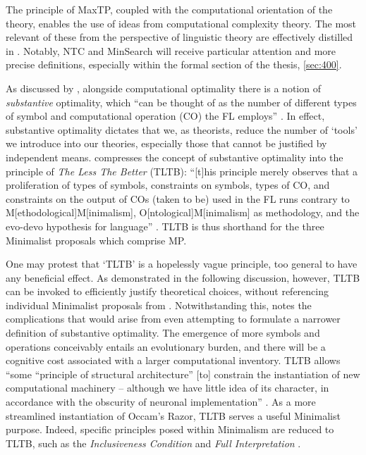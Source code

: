 The principle of MaxTP, coupled with the computational orientation of the theory, enables the use of ideas from computational complexity theory. The most relevant of these from the perspective of linguistic theory are effectively distilled in . Notably, NTC and MinSearch will receive particular attention and more precise definitions, especially within the formal section of the thesis, \autoref{sec:400}.

As discussed by \textcite{MobbsI_2015}, alongside computational optimality there is a notion of \textit{substantive} optimality, which ``can be thought of as the number of different types of symbol and computational operation (CO) the FL employs'' \parencite[f.n.~57]{MobbsI_2015}. In effect, substantive optimality dictates that we, as theorists, reduce the number of `tools' we introduce into our theories, especially those that cannot be justified by independent means. \textcite{MobbsI_2015} compresses the concept of substantive optimality into the principle of \textit{The Less The Better} (TLTB): ``[t]his principle merely observes that a proliferation of types of symbols, constraints on symbols, types of CO, and constraints on the output of COs (taken to be) used in the FL runs contrary to M[ethodological]M[inimalism], O[ntological]M[inimalism] as methodology, and the evo-devo hypothesis for language'' \parencite[61]{MobbsI_2015}. TLTB is thus shorthand for the three Minimalist proposals which comprise MP.

One may protest that `TLTB' is a hopelessly vague principle, too general to have any beneficial effect. As demonstrated in the following discussion, however, TLTB can be invoked to efficiently justify theoretical choices, without referencing individual Minimalist proposals from . Notwithstanding this, \textcite[f.n.~99]{MobbsI_2015} notes the complications that would arise from even attempting to formulate a narrower definition of substantive optimality. The emergence of more symbols and operations conceivably entails an evolutionary burden, and there will be a cognitive cost associated with a larger computational inventory. TLTB allows ``some ``principle of structural architecture'' [to] constrain the instantiation of new computational machinery -- although we have little idea of its character, in accordance with the obscurity of neuronal implementation'' \parencite[f.n.~99]{MobbsI_2015}. As a more streamlined instantiation of Occam's Razor, TLTB serves a useful Minimalist purpose. Indeed, specific principles posed within Minimalism are reduced to TLTB, such as the \textit{Inclusiveness Condition}  and \textit{Full Interpretation} .

